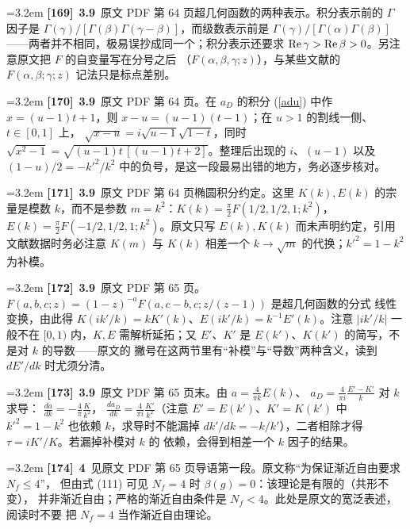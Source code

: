 \par
\par\medskip\noindent\hangindent=3.2em \textbf{[169]}~\textbf{3.9}~原文 PDF 第 64 页超几何函数的两种表示。积分表示前的 $\Gamma$ 因子是  $\Gamma(\gamma)/[\Gamma(\beta)\Gamma(\gamma-\beta)]$，而级数表示前是  $\Gamma(\gamma)/[\Gamma(\alpha)\Gamma(\beta)]$——两者并不相同，极易误抄成同一个；积分表示还要求  ${\rm Re}\,\gamma>{\rm Re}\,\beta>0$。另注意原文把 $F$ 的自变量写在分号之后  （$F(\alpha,\beta,\gamma;z)$），与某些文献的 $F(\alpha,\beta;\gamma;z)$ 记法只是标点差别。
\par
\par\medskip\noindent\hangindent=3.2em \textbf{[170]}~\textbf{3.9}~原文 PDF 第 64 页。在 $a_D$ 的积分 (\ref{adu}) 中作 $x=(u-1)t+1$，则  $x-u=(u-1)(t-1)$；在 $u>1$ 的割线一侧、$t\in[0,1]$ 上，  $\sqrt{x-u}=i\sqrt{u-1}\sqrt{1-t}$，同时  $\sqrt{x^2-1}=\sqrt{(u-1)t\,[(u-1)t+2]}$。整理后出现的 $i$、$(u-1)$ 以及  $(1-u)/2=-k'^2/k^2$ 中的负号，是这一段最易出错的地方，务必逐步核对。
\par
\par\medskip\noindent\hangindent=3.2em \textbf{[171]}~\textbf{3.9}~原文 PDF 第 64 页椭圆积分约定。这里 $K(k),E(k)$ 的宗量是模数 $k$，而不是参数  $m=k^2$：$K(k)=\frac{\pi}{2}F(1/2,1/2,1;k^2)$，$E(k)=\frac{\pi}{2}F(-1/2,1/2,1;k^2)$。原文只写  $E(k),K(k)$ 而未声明约定，引用文献数据时务必注意 $K(m)$ 与 $K(k)$ 相差一个 $k\to\sqrt m$  的代换；$k'^2=1-k^2$ 为补模。
\par
\par\medskip\noindent\hangindent=3.2em \textbf{[172]}~\textbf{3.9}~原文 PDF 第 65 页。$F(a,b,c;z)=(1-z)^{-a}F(a,c-b,c;z/(z-1))$ 是超几何函数的分式  线性变换，由此得 $K(ik'/k)=kK'(k)$、$E(ik'/k)=k^{-1}E'(k)$。注意 $|ik'/k|$ 一般不在 $[0,1)$  内，$K,E$ 需解析延拓；又 $E'$、$K'$ 是 $E(k')$、$K(k')$ 的简写，不是对 $k$ 的导数——原文的  撇号在这两节里有“补模”与“导数”两种含义，读到 $dE'/dk$ 时尤须分清。
\par
\par\medskip\noindent\hangindent=3.2em \textbf{[173]}~\textbf{3.9}~原文 PDF 第 65 页末。由 $a=\frac{4}{\pi k}E(k)$、  $a_D=\frac{4}{\pi i}\frac{E'-K'}{k}$ 对 $k$ 求导：  $\frac{da}{dk}=-\frac{4}{\pi}\frac{K}{k^2}$，  $\frac{da_D}{dk}=\frac{4}{\pi i}\frac{K'}{k^2}$（注意 $E'=E(k')$、$K'=K(k')$ 中 $k'^2=1-k^2$  也依赖 $k$，求导时不能漏掉 $dk'/dk=-k/k'$），二者相除才得 $\tau=iK'/K$。若漏掉补模对 $k$ 的  依赖，会得到相差一个 $k$ 因子的结果。
\par
\par\medskip\noindent\hangindent=3.2em \textbf{[174]}~\textbf{4}~见原文 PDF 第 65 页导语第一段。原文称“为保证渐近自由要求 $N_f\le4$”， 但由式 (111) 可见 $N_f=4$ 时 $\beta(g)=0$：该理论是有限的（共形不变）， 并非渐近自由；严格的渐近自由条件是 $N_f<4$。此处是原文的宽泛表述，阅读时不要 把 $N_f=4$ 当作渐近自由理论。
